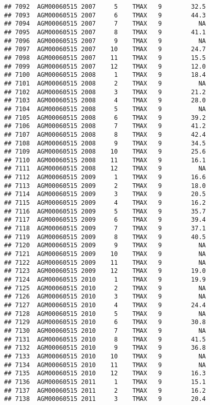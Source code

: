 \documentclass{article}\usepackage[]{graphicx}\usepackage[]{color}
\makeatletter
\newenvironment{kframe}{%
 \def\at@end@of@kframe{}%
 \ifinner\ifhmode%
  \def\at@end@of@kframe{\end{minipage}}%
  \begin{minipage}{\columnwidth}%
 \fi\fi%
 \def\FrameCommand##1{\hskip\@totalleftmargin \hskip-\fboxsep
 \colorbox{shadecolor}{##1}\hskip-\fboxsep
     \hskip-\linewidth \hskip-\@totalleftmargin \hskip\columnwidth}%
 \MakeFramed {\advance\hsize-\width
   \@totalleftmargin\z@ \linewidth\hsize
   \@setminipage}}%
 {\par\unskip\endMakeFramed%
 \at@end@of@kframe}
\newenvironment{knitrout}{}{} %
\makeatother
\begin{document}
\begin{knitrout}
\begin{kframe}
\begin{verbatim}
## 7092  AGM00060515 2007     5    TMAX   9        32.5
## 7093  AGM00060515 2007     6    TMAX   9        44.3
## 7094  AGM00060515 2007     7    TMAX   9          NA
## 7095  AGM00060515 2007     8    TMAX   9        41.1
## 7096  AGM00060515 2007     9    TMAX   9          NA
## 7097  AGM00060515 2007    10    TMAX   9        24.7
## 7098  AGM00060515 2007    11    TMAX   9        15.5
## 7099  AGM00060515 2007    12    TMAX   9        12.0
## 7100  AGM00060515 2008     1    TMAX   9        18.4
## 7101  AGM00060515 2008     2    TMAX   9          NA
## 7102  AGM00060515 2008     3    TMAX   9        21.2
## 7103  AGM00060515 2008     4    TMAX   9        28.0
## 7104  AGM00060515 2008     5    TMAX   9          NA
## 7105  AGM00060515 2008     6    TMAX   9        39.2
## 7106  AGM00060515 2008     7    TMAX   9        41.2
## 7107  AGM00060515 2008     8    TMAX   9        42.4
## 7108  AGM00060515 2008     9    TMAX   9        34.5
## 7109  AGM00060515 2008    10    TMAX   9        25.6
## 7110  AGM00060515 2008    11    TMAX   9        16.1
## 7111  AGM00060515 2008    12    TMAX   9          NA
## 7112  AGM00060515 2009     1    TMAX   9        16.6
## 7113  AGM00060515 2009     2    TMAX   9        18.0
## 7114  AGM00060515 2009     3    TMAX   9        20.5
## 7115  AGM00060515 2009     4    TMAX   9        16.2
## 7116  AGM00060515 2009     5    TMAX   9        35.7
## 7117  AGM00060515 2009     6    TMAX   9        39.4
## 7118  AGM00060515 2009     7    TMAX   9        37.1
## 7119  AGM00060515 2009     8    TMAX   9        40.5
## 7120  AGM00060515 2009     9    TMAX   9          NA
## 7121  AGM00060515 2009    10    TMAX   9          NA
## 7122  AGM00060515 2009    11    TMAX   9          NA
## 7123  AGM00060515 2009    12    TMAX   9        19.0
## 7124  AGM00060515 2010     1    TMAX   9        19.9
## 7125  AGM00060515 2010     2    TMAX   9          NA
## 7126  AGM00060515 2010     3    TMAX   9          NA
## 7127  AGM00060515 2010     4    TMAX   9        24.4
## 7128  AGM00060515 2010     5    TMAX   9          NA
## 7129  AGM00060515 2010     6    TMAX   9        30.8
## 7130  AGM00060515 2010     7    TMAX   9          NA
## 7131  AGM00060515 2010     8    TMAX   9        41.5
## 7132  AGM00060515 2010     9    TMAX   9        36.8
## 7133  AGM00060515 2010    10    TMAX   9          NA
## 7134  AGM00060515 2010    11    TMAX   9          NA
## 7135  AGM00060515 2010    12    TMAX   9        16.3
## 7136  AGM00060515 2011     1    TMAX   9        15.1
## 7137  AGM00060515 2011     2    TMAX   9        16.2
## 7138  AGM00060515 2011     3    TMAX   9        20.4

\end{verbatim}
\end{kframe}
\end{knitrout}
\end{document}
